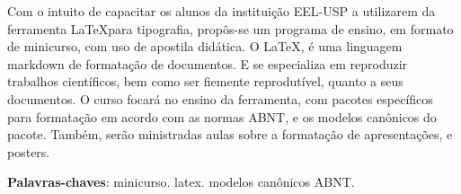 \documentclass[
	12pt,				%
	openright,			%
	oneside,			%
	a4paper,			%
        brazil,				%
	]{abntex2}
\begin{document}

\frenchspacing


\imprimircapa






\setlength{\absparsep}{18pt} %
\begin{resumo}
Com o intuito de capacitar os alunos da instituição EEL-USP a
utilizarem da ferramenta \LaTeX para tipografia, propôs-se um programa
de ensino, em formato de minicurso, com uso de apostila didática. O
\LaTeX, é uma linguagem markdown de formatação de documentos. E se especializa em reproduzir trabalhos científicos, bem
como ser fiemente reprodutível, quanto a seus documentos. O curso focará no
ensino da ferramenta, com pacotes específicos para formatação em
acordo com as normas ABNT, e os modelos canônicos do pacote. Também,
serão ministradas aulas sobre a formatação de apresentações, e posters.

 \noindent
 \textbf{Palavras-chaves}: minicurso. latex. modelos canônicos ABNT.
\end{resumo}


\tableofcontents*
\end{document}
